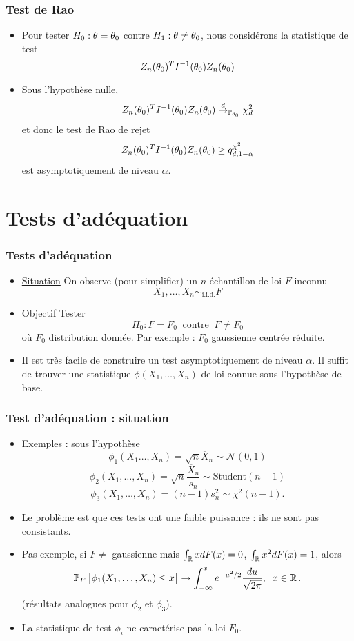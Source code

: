 \begin{frame}
\frametitle{Test de Rao}
\begin{itemize}
\item Pour tester $H_0: \theta= \theta_0$ contre $H_1: \theta \ne \theta_0$, nous considérons la statistique de test
\[
Z_n(\theta_0)^T I^{-1} (\theta_0) Z_n(\theta_0)
\]
\item Sous l'hypothèse nulle,
$$
Z_n(\theta_0)^T I^{-1} (\theta_0) Z_n(\theta_0) \stackrel{d}{\rightarrow}_{\operatorname{{\mathbb P}}_{\theta_0}} \chi^2_d
$$
et donc le test de Rao de rejet
$$
Z_n(\theta_0)^T I^{-1} (\theta_0) Z_n(\theta_0) \geq q_{d,1-\alpha}^{\chi^2}
$$
est asymptotiquement de niveau $\alpha$.
\end{itemize}
\end{frame}

\section{Tests d'adéquation}

\begin{frame}
\frametitle{Tests d'adéquation}
\begin{itemize}
\item \underline{Situation} On observe (pour simplifier) un $n$-échantillon de loi $F$ inconnu
$$X_1,\ldots, X_n\sim_{\text{i.i.d.}}F$$
\item \alert{Objectif} Tester
$$H_0:F=F_0\;\;\text{contre}\;\;F\neq F_0$$
où
$F_0$ distribution donnée. Par exemple : $F_0$ \alert{gaussienne centrée réduite}.
\item Il est \alert{très facile de construire un test asymptotiquement de niveau $\alpha$.}
Il suffit de trouver une statistique $\phi(X_1,\ldots, X_n)$ de loi connue sous l'hypothèse de base.
\end{itemize}
\end{frame}

\begin{frame}
\frametitle{Test d'adéquation : situation}
\begin{itemize}
\item \alert{Exemples : sous l'hypothèse}
$$\phi_1(X_1\ldots, X_n) = \sqrt{n}\overline{X}_n \sim {\mathcal N}(0,1)$$
$$\phi_2(X_1,\ldots, X_n) = \sqrt{n}\frac{\overline{X}_n}{s_n} \sim \text{Student}(n-1)$$
$$\phi_3(X_1,\ldots, X_n) = (n-1)s_n^2 \sim \chi^2(n-1).$$
\item Le problème est que ces tests \alert{ont une faible puissance} : ils ne sont pas consistants.
\item Pas exemple, si $F\neq$ gaussienne mais $\int_{\operatorname{{\mathbb R}}}xdF(x)=0$, $\int_{\operatorname{{\mathbb R}}}x^2dF(x)=1$, alors
$$\operatorname{{\mathbb P}}_{F}\big[\phi_1(X_1,\ldots,X_n) \leq x \big] \rightarrow \int_{-\infty}^x e^{-u^2/2}\frac{du}{\sqrt{2\pi}},\;\;x \in \operatorname{{\mathbb R}}.$$
(résultats analogues pour $\phi_2$ et $\phi_3$).
\item La statistique de test $\phi_i$ \alert{ne caractérise pas} la loi $F_0$.
\end{itemize}
\end{frame}


